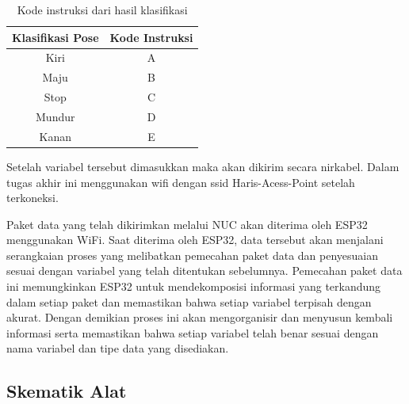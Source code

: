 \begin{longtable}{|c|c|}
    \caption{Kode instruksi dari hasil klasifikasi}
    \label{tbl:kode-instruksi}\\
        \hline
        Klasifikasi Pose & Kode Instruksi \\ \hline
        \endfirsthead
        \endhead
        Kiri             & A              \\ \hline
        Maju             & B              \\ \hline
        Stop             & C              \\ \hline
        Mundur           & D              \\ \hline
        Kanan            & E              \\ \hline
\end{longtable}


Setelah variabel tersebut dimasukkan maka akan dikirim secara nirkabel. Dalam tugas akhir ini menggunakan wifi dengan ssid Haris-Acess-Point setelah terkoneksi.

Paket data yang telah dikirimkan melalui NUC akan diterima oleh ESP32 menggunakan WiFi. Saat diterima oleh ESP32, data tersebut akan menjalani serangkaian proses yang melibatkan pemecahan paket data dan penyesuaian sesuai dengan variabel yang telah ditentukan sebelumnya. Pemecahan paket data ini memungkinkan ESP32 untuk mendekomposisi informasi yang terkandung dalam setiap paket dan memastikan bahwa setiap variabel terpisah dengan akurat. Dengan demikian proses ini akan mengorganisir dan menyusun kembali informasi serta memastikan bahwa setiap variabel telah benar sesuai dengan nama variabel dan tipe data yang disediakan.

\subsection{Skematik Alat}

